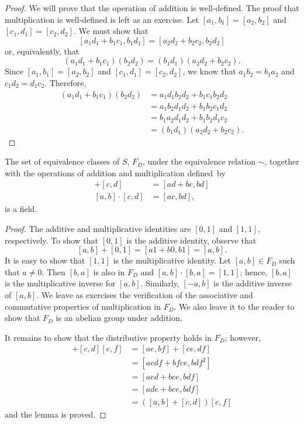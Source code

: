 \begin{proof}
We will prove that the operation of addition is well-defined.  The
proof that multiplication is well-defined is left as an exercise.
Let $[a_1, b_1] = [a_2, b_2]$ and $[c_1, d_1] =[ c_2, d_2]$.  We must
show that
\[
[a_1 d_1 + b_1 c_1,b_1 d_1] = [a_2 d_2 + b_2 c_2,b_2 d_2]
\]
or, equivalently, that
\[
(a_1 d_1 + b_1 c_1)( b_2 d_2) = (b_1 d_1) (a_2 d_2 + b_2 c_2).
\]
Since  $[a_1, b_1] = [a_2, b_2]$ and $[c_1, d_1] =[ c_2, d_2]$, we
know that $a_1 b_2 = b_1 a_2$ and $c_1 d_2 = d_1 c_2$.  Therefore,
\begin{align*}
(a_1 d_1 + b_1 c_1)( b_2 d_2) 
& = 
a_1 d_1 b_2 d_2 + b_1 c_1 b_2 d_2 \\
& =
a_1 b_2 d_1 d_2 + b_1 b_2 c_1 d_2 \\
& =
b_1 a_2 d_1 d_2 + b_1 b_2 d_1 c_2 \\
& = 
(b_1 d_1) (a_2 d_2 + b_2 c_2).
\end{align*}
\end{proof}
 

\begin{lemma}\label{domains:field_fractions_lemma}
The set of equivalence classes of $S$, $F_D$, under the equivalence
relation $\sim$, together with the operations of addition and 
multiplication defined~by
\begin{align*}
[a, b] + [c, d] & = [ad + b c, b d] \\
{[ a, b]} \cdot [c, d] & = [ac, b d],
\end{align*}
is a field.
\end{lemma}
 

\begin{proof}
The additive and multiplicative identities are $[0,1]$ and $[1,1]$, 
respectively. To show that $[0,1]$ is the additive identity, observe 
that
\[
[a, b] + [0, 1] =  [ a 1 + b 0, b 1] = [a,b].
\]
It is easy to show that $[1, 1]$ is the multiplicative identity. Let
$[a, b] \in F_D$ such that $a \neq 0$. Then $[b, a]$ is also in $F_D$
and $[a,b] \cdot [b, a] = [1,1]$; hence, $[b, a]$ is the
multiplicative inverse for $[a, b]$.  Similarly, $[-a,b]$ is the
additive inverse of $[a, b]$.  We leave as exercises the verification
of the associative and  commutative properties of multiplication in
$F_D$. We also leave it to the reader to show that $F_D$ is an abelian
group under addition.  
 
 
It remains to show that the distributive property holds in $F_D$;
however, 
\begin{align*}
[a, b] [e, f] + [c, d][ e, f ] 
& = 
[a e, b f ] + [c e, d f] \\
& =
[a e d f + b f c e, b d f^2 ] \\
& =
[a e d + b c e, b d f ] \\
& =
[a d e + b c e, b d f ] \\
& =
( [a, b]  + [c, d] ) [ e, f ] 
\end{align*}
and the lemma is proved.
\end{proof} 	


